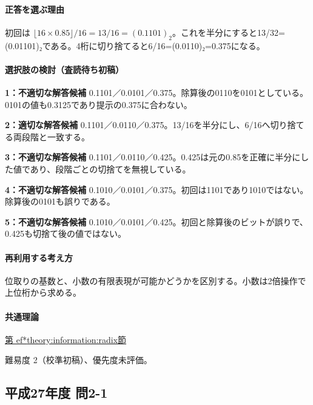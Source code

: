 \paragraph{正答を選ぶ理由} 初回は \(\lfloor16\times0.85\rfloor/16=13/16=(0.1101)_2\)。これを半分にすると13/32=(0.01101)₂である。4桁に切り捨てると6/16=(0.0110)₂=0.375になる。

\paragraph{選択肢の検討（査読待ち初稿）}

\noindent\textbf{1：不適切な解答候補} 0.1101／0.0101／0.375。除算後の0110を0101としている。0101の値も0.3125であり提示の0.375に合わない。\par

\noindent\textbf{2：適切な解答候補} 0.1101／0.0110／0.375。13/16を半分にし、6/16へ切り捨てる両段階と一致する。\par

\noindent\textbf{3：不適切な解答候補} 0.1101／0.0110／0.425。0.425は元の0.85を正確に半分にした値であり、段階ごとの切捨てを無視している。\par

\noindent\textbf{4：不適切な解答候補} 0.1010／0.0101／0.375。初回は1101であり1010ではない。除算後の0101も誤りである。\par

\noindent\textbf{5：不適切な解答候補} 0.1010／0.0101／0.425。初回と除算後のビットが誤りで、0.425も切捨て後の値ではない。\par

\paragraph{再利用する考え方} 位取りの基数と、小数の有限表現が可能かどうかを区別する。小数は2倍操作で上位桁から求める。

\paragraph{共通理論} \hyperref[theory:information:radix]{第
ef*{theory:information:radix}節}

\par 難易度 2（校準初稿）、優先度未評価。

\subsection{平成27年度 問2-1}
\label{q:h27-reg-basic-2-1}

